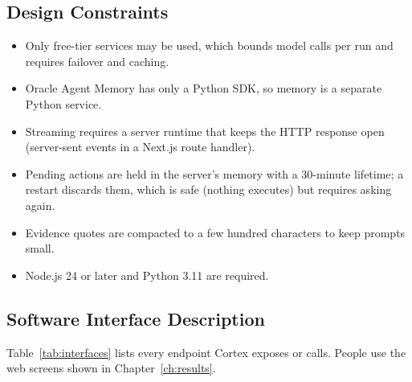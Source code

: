 \documentclass[oneside,a4paper,12pt]{report}
\begin{document}
 \subsection{Design Constraints}
\begin{itemize}
\item Only free-tier services may be used, which bounds model calls per run and requires failover and caching.
\item Oracle Agent Memory has only a Python SDK, so memory is a separate Python service.
\item Streaming requires a server runtime that keeps the HTTP response open (server-sent events in a Next.js route handler).
\item Pending actions are held in the server's memory with a 30-minute lifetime; a restart discards them, which is safe (nothing executes) but requires asking again.
\item Evidence quotes are compacted to a few hundred characters to keep prompts small.
\item Node.js 24 or later and Python 3.11 are required.
\end{itemize}
 \subsection{Software Interface Description}
Table~\ref{tab:interfaces} lists every endpoint Cortex exposes or calls. People use the web screens shown in Chapter~\ref{ch:results}.
\end{document}
